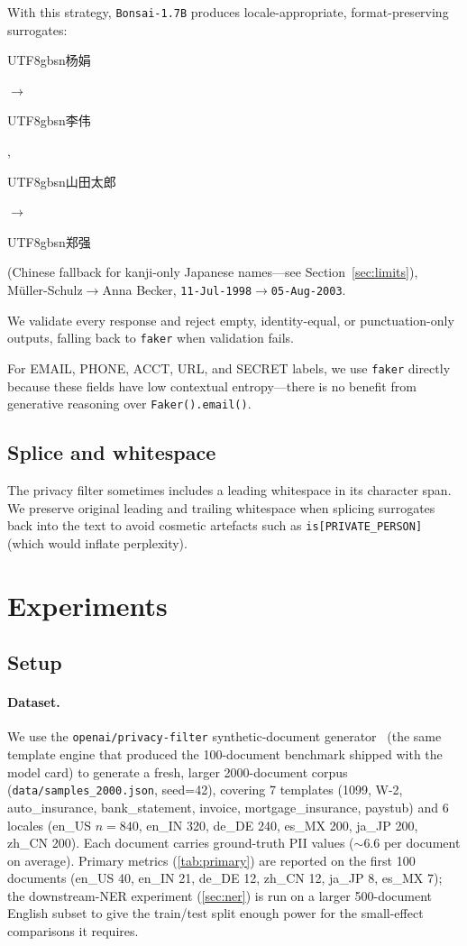 \documentclass[11pt]{article}
\newcommand{\code}[1]{\texttt{#1}}
\newcommand{\arrowto}{\ensuremath{\rightarrow}}
\newcommand{\openaipf}{\code{openai/privacy-filter}}
\newcommand{\bonsai}{\code{Bonsai-1.7B}}
\newcommand{\faker}{\code{faker}}
\newcommand{\cjk}[1]{\begin{CJK*}{UTF8}{gbsn}#1\end{CJK*}}
\begin{document}
With this strategy, \bonsai{} produces locale-appropriate,
format-preserving surrogates: \cjk{杨娟}\arrowto{}\cjk{李伟},
\cjk{山田太郎}\arrowto{}\cjk{郑强} (Chinese fallback for kanji-only
Japanese names---see Section~\ref{sec:limits}),
M\"uller-Schulz\arrowto{}Anna Becker,
\code{11-Jul-1998}\arrowto{}\code{05-Aug-2003}.

We validate every response and reject empty, identity-equal, or
punctuation-only outputs, falling back to \faker{} when validation
fails.

For EMAIL, PHONE, ACCT, URL, and SECRET labels, we use \faker{}
directly because these fields have low contextual entropy---there is
no benefit from generative reasoning over \code{Faker().email()}.

\subsection{Splice and whitespace}
\label{sec:splice}

The privacy filter sometimes includes a leading whitespace in its
character span. We preserve original leading and trailing whitespace
when splicing surrogates back into the text to avoid cosmetic artefacts
such as \code{is[PRIVATE\_PERSON]} (which would inflate perplexity).

\section{Experiments}
\label{sec:exp}

\subsection{Setup}
\label{sec:setup}

\paragraph{Dataset.}
We use the \openaipf{} synthetic-document
generator~\cite{privacyfilter} (the same template engine
that produced the 100-document benchmark shipped with the model card)
to generate a fresh, larger 2000-document corpus
(\code{data/samples\_2000.json}, seed=42), covering 7 templates (1099,
W-2, auto\_insurance, bank\_statement, invoice, mortgage\_insurance,
paystub) and 6 locales (en\_US $n{=}840$, en\_IN 320, de\_DE 240,
es\_MX 200, ja\_JP 200, zh\_CN 200). Each document carries ground-truth
PII values ($\sim$6.6 per document on average). Primary metrics
(\cref{tab:primary}) are reported on the first 100 documents
(en\_US 40, en\_IN 21, de\_DE 12, zh\_CN 12, ja\_JP 8, es\_MX 7); the
downstream-NER experiment (\cref{sec:ner}) is run on a larger
500-document English subset to give the train/test split enough power
for the small-effect comparisons it requires.
\end{document}
